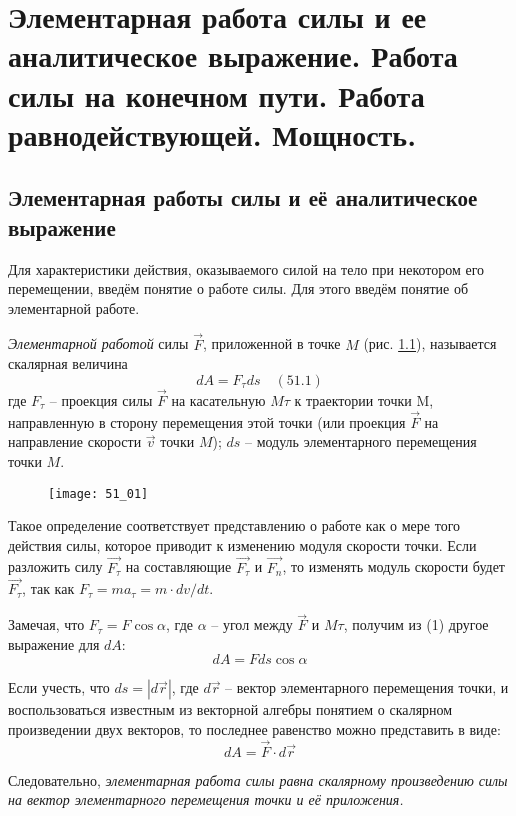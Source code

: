 \chapter{Элементарная работа силы и ее аналитическое выражение. Работа силы на
конечном пути. Работа равнодействующей. Мощность.}

\section{Элементарная работы силы и её аналитическое выражение}
Для характеристики действия, оказываемого силой на тело при некотором его 
перемещении, введём понятие о работе силы. Для этого введём понятие об 
элементарной работе.

\emph{Элементарной работой} силы \( \vec{F} \), приложенной в точке 
\( M \) (рис. \ref{pic51_01}), называется скалярная величина
\[ dA = F_\tau ds \quad (51.1) \]
где \( F_\tau \) -- проекция силы \( \vec{F} \) на касательную \( M\tau \) 
к траектории точки M, направленную в сторону перемещения этой точки 
(или проекция \( \vec{F} \) на направление скорости \( \vec{v} \) точки 
\( M \)); \( ds \) -- модуль элементарного перемещения точки \( M \).

\begin{figure}[h!]
    \texttt{[image: 51\_01]}
    \parbox{.47\textwidth}{\caption{} \label{pic51_01}}
\end{figure}

Такое определение соответствует представлению о работе как о мере того 
действия силы, которое приводит к изменению модуля скорости точки. Если 
разложить силу \( \vec{F_\tau} \) на составляющие \( \vec{F_\tau} \) и 
\( \vec{F_n} \), то изменять модуль скорости будет \( \vec{F_\tau} \), 
так как \( F_\tau = ma_\tau = m\cdot dv/dt \).

Замечая, что \( F_\tau = F\cos\alpha \), где \( \alpha \) -- угол между 
\( \vec{F} \) и \( M\tau \), получим из (1) другое выражение для \( dA \):
\[ dA = Fds\cos\alpha \]

Если учесть, что \( ds = |d\vec{r}| \), где \( d\vec{r} \) -- вектор 
элементарного перемещения точки, и воспользоваться известным из векторной 
алгебры понятием о скалярном произведении двух векторов, то последнее 
равенство можно представить в виде:
\[ dA = \vec{F}\cdot d\vec{r} \]

Следовательно, \emph{элементарная работа силы равна скалярному произведению 
силы на вектор элементарного перемещения точки и её приложения.}


